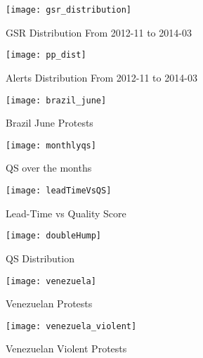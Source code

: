 \begin{figure}
    \texttt{[image: gsr\_distribution]}
    \label{fig:gsrdistribution}
    \caption{GSR Distribution From 2012-11 to 2014-03}
\end{figure}

\begin{figure}
    \texttt{[image: pp\_dist]}
    \label{fig:ppdistribution}
    \caption{Alerts Distribution From 2012-11 to 2014-03}
\end{figure}

\begin{figure}
    \texttt{[image: brazil\_june]}
    \label{fig:brazil_june}
    \caption{Brazil June Protests}
\end{figure}

%

\begin{figure}
    \texttt{[image: monthlyqs]}
    \caption{QS over the months}
    \label{fig:monthlyqs}
\end{figure}

\begin{figure}
    \texttt{[image: leadTimeVsQS]}
    \caption{Lead-Time vs Quality Score}
    \label{fig:leadTimeVsQS}
\end{figure}

\begin{figure}
    \texttt{[image: doubleHump]}
    \caption{QS Distribution}
    \label{fig:doubleHump}
\end{figure}

\begin{figure}
    \texttt{[image: venezuela]}
    \label{fig:venezuela_feb}
    \caption{Venezuelan Protests}
\end{figure}

\begin{figure}
    \texttt{[image: venezuela\_violent]}
    \label{fig:venezuela_violent}
    \caption{Venezuelan Violent Protests}
\end{figure}

